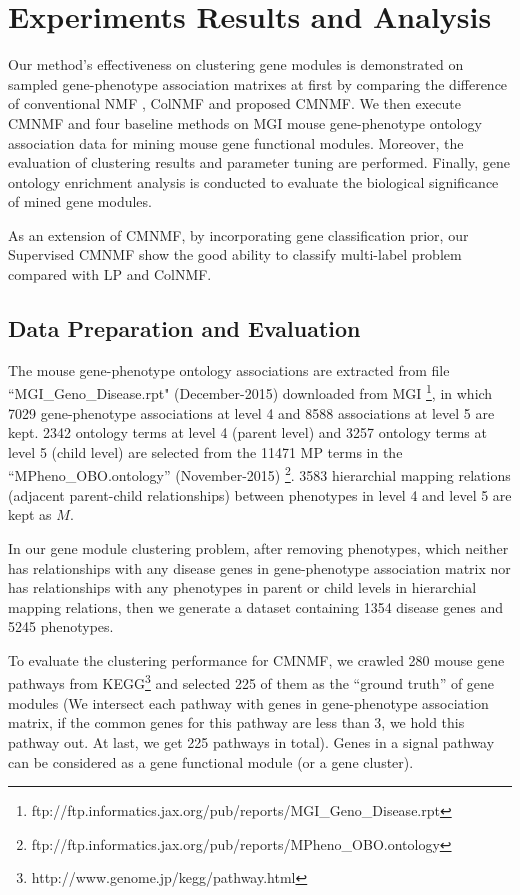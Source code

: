 \documentclass{bmcart}
\begin{document}
\section*{Experiments Results and Analysis}
Our method's effectiveness on clustering gene modules is demonstrated on sampled gene-phenotype association matrixes at first by comparing the difference of conventional NMF , ColNMF and proposed CMNMF. We then execute CMNMF and four baseline methods on MGI mouse gene-phenotype ontology association data for mining mouse gene functional modules. Moreover, the evaluation of clustering results and parameter tuning are performed. Finally, gene ontology enrichment analysis is conducted to evaluate the biological significance of mined gene modules.

As an extension of CMNMF, by incorporating gene classification prior, our Supervised CMNMF show the good ability to classify multi-label problem compared with LP and ColNMF.
\subsection*{\textbf{Data Preparation and Evaluation}}
 The mouse gene-phenotype ontology associations are extracted from file ``MGI\_Geno\_Disease.rpt" (December-2015) downloaded from MGI \footnote{ftp://ftp.informatics.jax.org/pub/reports/MGI\_Geno\_Disease.rpt}, in which 7029 gene-phenotype associations at level 4 and 8588 associations at level 5 are kept. 2342 ontology terms at level 4 (parent level) and 3257 ontology terms at level 5 (child level)  are selected from the 11471 MP terms in the ``MPheno\_OBO.ontology'' (November-2015) \footnote{ftp://ftp.informatics.jax.org/pub/reports/MPheno\_OBO.ontology}. 3583 hierarchial mapping relations (adjacent parent-child relationships) between phenotypes in level 4 and level 5 are kept as $M$.

In our gene module clustering problem,
after removing phenotypes, which neither has relationships with any disease genes in gene-phenotype association matrix nor has relationships with any phenotypes in parent or child levels in hierarchial mapping relations, then we generate a dataset containing 1354 disease genes and 5245 phenotypes.

To evaluate the clustering performance for CMNMF, we crawled 280 mouse gene pathways from KEGG\footnote{http://www.genome.jp/kegg/pathway.html} and selected 225 of them as the ``ground truth'' of gene modules (We intersect each pathway with genes in gene-phenotype association matrix, if the common genes for this pathway are less than 3, we hold this pathway out. At last, we get 225 pathways in total). Genes in a signal pathway can be considered as a gene functional module (or a gene cluster).
\end{document}
